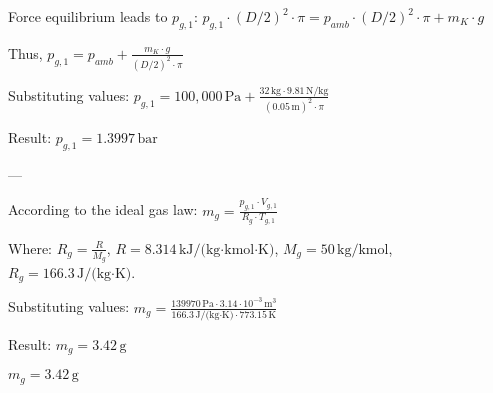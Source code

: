 Force equilibrium leads to \( p_{g,1} \):  
\( p_{g,1} \cdot (D/2)^2 \cdot \pi = p_{amb} \cdot (D/2)^2 \cdot \pi + m_K \cdot g \)  

Thus,  
\( p_{g,1} = p_{amb} + \frac{m_K \cdot g}{(D/2)^2 \cdot \pi} \)  

Substituting values:  
\( p_{g,1} = 100{,}000 \, \text{Pa} + \frac{32 \, \text{kg} \cdot 9.81 \, \text{N/kg}}{(0.05 \, \text{m})^2 \cdot \pi} \)  

Result:  
\( p_{g,1} = 1.3997 \, \text{bar} \)  

---

According to the ideal gas law:  
\( m_g = \frac{p_{g,1} \cdot V_{g,1}}{R_g \cdot T_{g,1}} \)  

Where:  
\( R_g = \frac{R}{M_g} \),  
\( R = 8.314 \, \text{kJ/(kg·kmol·K)} \),  
\( M_g = 50 \, \text{kg/kmol} \),  
\( R_g = 166.3 \, \text{J/(kg·K)} \).  

Substituting values:  
\( m_g = \frac{139970 \, \text{Pa} \cdot 3.14 \cdot 10^{-3} \, \text{m}^3}{166.3 \, \text{J/(kg·K)} \cdot 773.15 \, \text{K}} \)  

Result:  
\( m_g = 3.42 \, \text{g} \)  

\( m_g = 3.42 \, \text{g} \)